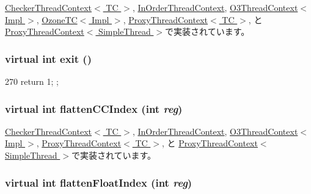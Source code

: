 \hyperlink{classCheckerThreadContext_a13fa12d1779a94a1e0b968946a1367c7}{CheckerThreadContext$<$ TC $>$}, \hyperlink{classInOrderThreadContext_a13fa12d1779a94a1e0b968946a1367c7}{InOrderThreadContext}, \hyperlink{classO3ThreadContext_a13fa12d1779a94a1e0b968946a1367c7}{O3ThreadContext$<$ Impl $>$}, \hyperlink{classOzoneCPU_1_1OzoneTC_a13fa12d1779a94a1e0b968946a1367c7}{OzoneTC$<$ Impl $>$}, \hyperlink{classProxyThreadContext_a13fa12d1779a94a1e0b968946a1367c7}{ProxyThreadContext$<$ TC $>$}, と \hyperlink{classProxyThreadContext_a13fa12d1779a94a1e0b968946a1367c7}{ProxyThreadContext$<$ SimpleThread $>$}で実装されています。\hypertarget{classThreadContext_ac4ce3a35ac3fb01bbe84ecb0d8d19677}{
\subsubsection[{exit}]{\setlength{\rightskip}{0pt plus 5cm}virtual int exit ()}}
\label{classThreadContext_ac4ce3a35ac3fb01bbe84ecb0d8d19677}



\begin{DoxyCode}
270 { return 1; };
\end{DoxyCode}
\hypertarget{classThreadContext_aedffeaa2c4a155d5916a2ae379d77a51}{
\subsubsection[{flattenCCIndex}]{\setlength{\rightskip}{0pt plus 5cm}virtual int flattenCCIndex (int {\em reg})}}
\label{classThreadContext_aedffeaa2c4a155d5916a2ae379d77a51}


\hyperlink{classCheckerThreadContext_ac33d74353e36a595ec48962cd0446320}{CheckerThreadContext$<$ TC $>$}, \hyperlink{classInOrderThreadContext_ac33d74353e36a595ec48962cd0446320}{InOrderThreadContext}, \hyperlink{classO3ThreadContext_ac33d74353e36a595ec48962cd0446320}{O3ThreadContext$<$ Impl $>$}, \hyperlink{classProxyThreadContext_ac33d74353e36a595ec48962cd0446320}{ProxyThreadContext$<$ TC $>$}, と \hyperlink{classProxyThreadContext_ac33d74353e36a595ec48962cd0446320}{ProxyThreadContext$<$ SimpleThread $>$}で実装されています。\hypertarget{classThreadContext_a7176627444d21b2734a0855b67e6aacf}{
\subsubsection[{flattenFloatIndex}]{\setlength{\rightskip}{0pt plus 5cm}virtual int flattenFloatIndex (int {\em reg})}}
\label{classThreadContext_a7176627444d21b2734a0855b67e6aacf}


